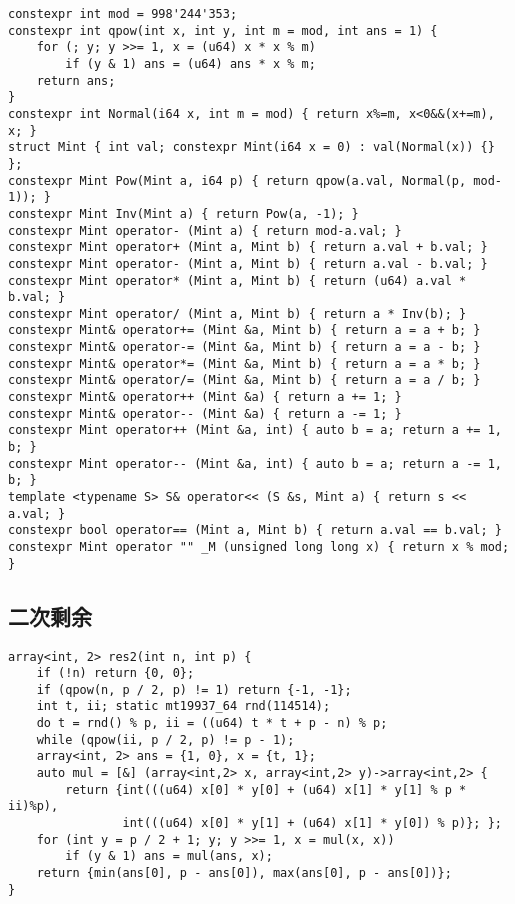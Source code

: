 \documentclass[a4paper,landscape,twocolumn]{ctexart}
\begin{document}
\begin{lstlisting}[]
constexpr int mod = 998'244'353;
constexpr int qpow(int x, int y, int m = mod, int ans = 1) {
	for (; y; y >>= 1, x = (u64) x * x % m)
		if (y & 1) ans = (u64) ans * x % m;
	return ans;
}
constexpr int Normal(i64 x, int m = mod) { return x%=m, x<0&&(x+=m), x; }
struct Mint { int val; constexpr Mint(i64 x = 0) : val(Normal(x)) {} };
constexpr Mint Pow(Mint a, i64 p) { return qpow(a.val, Normal(p, mod-1)); }
constexpr Mint Inv(Mint a) { return Pow(a, -1); }
constexpr Mint operator- (Mint a) { return mod-a.val; }
constexpr Mint operator+ (Mint a, Mint b) { return a.val + b.val; }
constexpr Mint operator- (Mint a, Mint b) { return a.val - b.val; }
constexpr Mint operator* (Mint a, Mint b) { return (u64) a.val * b.val; }
constexpr Mint operator/ (Mint a, Mint b) { return a * Inv(b); }
constexpr Mint& operator+= (Mint &a, Mint b) { return a = a + b; }
constexpr Mint& operator-= (Mint &a, Mint b) { return a = a - b; }
constexpr Mint& operator*= (Mint &a, Mint b) { return a = a * b; }
constexpr Mint& operator/= (Mint &a, Mint b) { return a = a / b; }
constexpr Mint& operator++ (Mint &a) { return a += 1; }
constexpr Mint& operator-- (Mint &a) { return a -= 1; }
constexpr Mint operator++ (Mint &a, int) { auto b = a; return a += 1, b; }
constexpr Mint operator-- (Mint &a, int) { auto b = a; return a -= 1, b; }
template <typename S> S& operator<< (S &s, Mint a) { return s << a.val; }
constexpr bool operator== (Mint a, Mint b) { return a.val == b.val; }
constexpr Mint operator "" _M (unsigned long long x) { return x % mod; }
\end{lstlisting}

\subsection{二次剩余}

\begin{lstlisting}[]
array<int, 2> res2(int n, int p) {
	if (!n) return {0, 0};
	if (qpow(n, p / 2, p) != 1) return {-1, -1};
	int t, ii; static mt19937_64 rnd(114514);
	do t = rnd() % p, ii = ((u64) t * t + p - n) % p;
	while (qpow(ii, p / 2, p) != p - 1);
	array<int, 2> ans = {1, 0}, x = {t, 1};
	auto mul = [&] (array<int,2> x, array<int,2> y)->array<int,2> {
		return {int(((u64) x[0] * y[0] + (u64) x[1] * y[1] % p * ii)%p),
				int(((u64) x[0] * y[1] + (u64) x[1] * y[0]) % p)}; };
	for (int y = p / 2 + 1; y; y >>= 1, x = mul(x, x))
		if (y & 1) ans = mul(ans, x);
	return {min(ans[0], p - ans[0]), max(ans[0], p - ans[0])};
}
\end{lstlisting}
\end{document}
